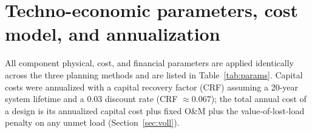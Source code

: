 \documentclass[11pt]{article}
\begin{document}
\section{Techno-economic parameters, cost model, and annualization}\label{sec:cost}
All component physical, cost, and financial parameters are applied identically across the three
planning methods and are listed in Table~\ref{tab:params}. Capital costs were annualized with a
capital recovery factor (CRF) assuming a 20-year system lifetime and a 0.03 discount rate
(CRF $\approx 0.067$); the total annual cost of a design is its annualized capital cost plus fixed
O\&M plus the value-of-lost-load penalty on any unmet load (Section~\ref{sec:voll}).
\end{document}
